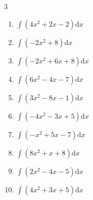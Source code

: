 \begin{multicols}{3}
\begin{enumerate}

\columnbreak %

\resetques

  \item $\displaystyle \int \left( 4x^{2}+2x-2 \right) \mathrm{d}x$


  \item $\displaystyle \int \left( -2x^{2}+8 \right) \mathrm{d}x$


  \item $\displaystyle \int \left( -2x^{2}+6x+8 \right) \mathrm{d}x$


  \item $\displaystyle \int \left( 6x^{2}-4x-7 \right) \mathrm{d}x$


  \item $\displaystyle \int \left( 3x^{2}-8x-1 \right) \mathrm{d}x$


  \item $\displaystyle \int \left( -4x^{2}-3x+5 \right) \mathrm{d}x$


  \item $\displaystyle \int \left( -x^{2}+5x-7 \right) \mathrm{d}x$


  \item $\displaystyle \int \left( 8x^{2}+x+8 \right) \mathrm{d}x$


  \item $\displaystyle \int \left( 2x^{2}-4x-5 \right) \mathrm{d}x$


  \item $\displaystyle \int \left( 4x^{2}+3x+5 \right) \mathrm{d}x$


\end{enumerate}
\end{multicols}
